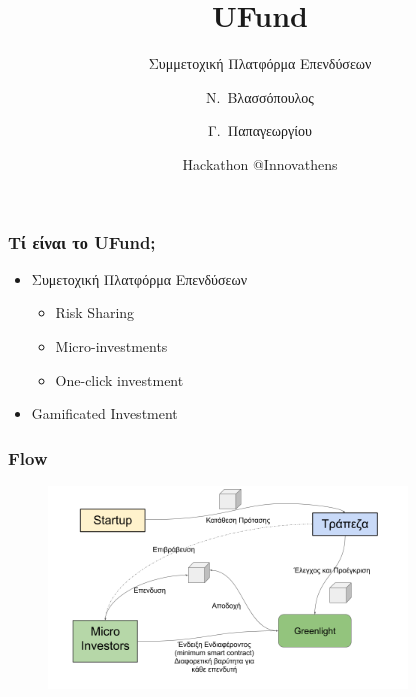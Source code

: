 \documentclass[xetex,mathserif,serif]{beamer}
\title[UFund] %
{UFund}
\subtitle{Συμμετοχική Πλατφόρμα Επενδύσεων}
\author %
{Ν.~Βλασσόπουλος \and Γ.~Παπαγεωργίου}
\institute{}
\date[24-04-2016] %
{Hackathon @Innovathens}
\begin{document}
\frame{\titlepage}

\begin{frame}
  \frametitle{Τί είναι το UFund;}
  \begin{itemize}
  \item Συμετοχική Πλατφόρμα Επενδύσεων
    \begin{itemize}
    \item Risk Sharing
    \item Micro-investments
    \item One-click investment
    \end{itemize}
  \item Gamificated Investment
  \end{itemize}
\end{frame}


\begin{frame}
  \frametitle{Flow}
  \begin{figure}
    \centering
    \includegraphics[width=0.85\textwidth]{hack-slide.png}
  \end{figure}
\end{frame}
\end{document}
